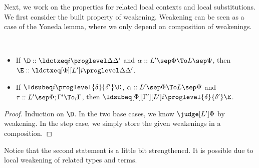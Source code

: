 Next, we work on the properties for related local contexts and local substitutions. %
We first consider the built property of weakening. %
Weakening can be seen as a case of the Yoneda lemma, where we only depend on
composition of weakenings.
\begin{lemma}[Weakening] $ $
  \begin{itemize}
  \item If $\D :: \ldctxeq i \proglevel \Delta{\Delta'}$ and  $\alpha :: L' \sep \Phi \To L \sep
    \Psi$, then $\E :: \ldctxeq[\Phi][L'] i \proglevel \Delta{\Delta'}$.
  \item If $\ldsubeq i \proglevel{\delta}{\delta'}\D$, $\alpha :: L' \sep \Phi \To L \sep \Psi$
    and $\tau :: L' \sep \Phi; \Gamma' \To_i \Gamma$, then
    $\ldsubeq[\Phi][\Gamma'][L'] i \proglevel{\delta}{\delta'}\E$.
  \end{itemize}
\end{lemma}
\begin{proof}
  Induction on $\D$. %
  In the two base cases, we know $\judge[L']\Phi$ by weakening. %
  In the step case, we simply store the given weakenings in a composition. %
\end{proof}
Notice that the second statement is a little bit strengthened. %
It is possible due to local weakening of related types and terms. %

